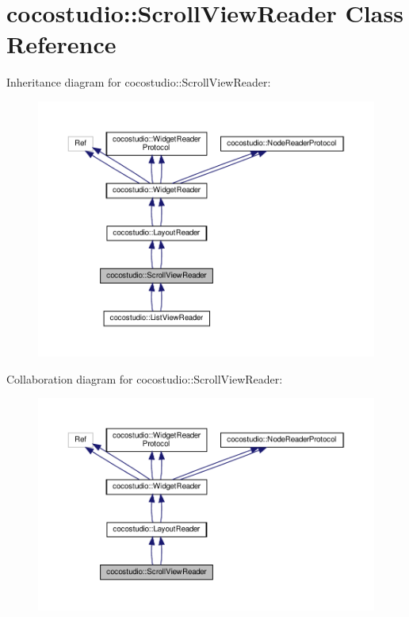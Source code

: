 \hypertarget{classcocostudio_1_1ScrollViewReader}{}\section{cocostudio\+:\+:Scroll\+View\+Reader Class Reference}
\label{classcocostudio_1_1ScrollViewReader}


Inheritance diagram for cocostudio\+:\+:Scroll\+View\+Reader\+:
\nopagebreak
\begin{figure}[H]
\begin{center}
\leavevmode
\includegraphics[width=350pt]{classcocostudio_1_1ScrollViewReader__inherit__graph}
\end{center}
\end{figure}


Collaboration diagram for cocostudio\+:\+:Scroll\+View\+Reader\+:
\nopagebreak
\begin{figure}[H]
\begin{center}
\leavevmode
\includegraphics[width=350pt]{classcocostudio_1_1ScrollViewReader__coll__graph}
\end{center}
\end{figure}
